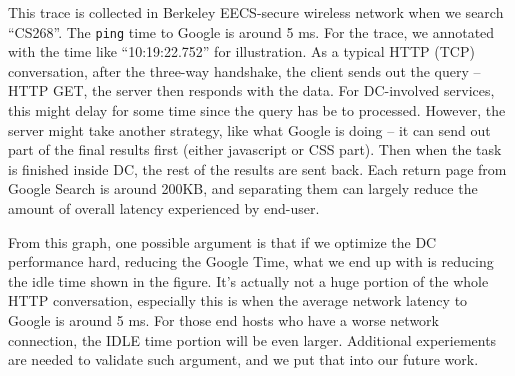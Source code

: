 This trace is collected in Berkeley EECS-secure wireless network when we search ``CS268''. The \texttt{ping} time to Google is around 5 ms. For the trace, we annotated with the time like ``10:19:22.752'' for illustration. As a typical HTTP (TCP) conversation, after the three-way handshake, the client sends out the query -- HTTP GET, the server then responds with the data. For DC-involved services, this might delay for some time since the query has be to processed. However, the server might take another strategy, like what Google is doing -- it can send out part of the final results first (either javascript or CSS part). Then when the task is finished inside DC, the rest of the results are sent back. Each return page from Google Search is around 200KB, and separating them can largely reduce the amount of overall latency experienced by end-user. 

From this graph, one possible argument is that if we optimize the DC performance hard, reducing the Google Time, what we end up with is reducing the idle time shown in the figure. It's actually not a huge portion of the whole HTTP conversation, especially this is when the average network latency to Google is around 5 ms. For those end hosts who have a worse network connection, the IDLE time portion will be even larger. Additional experiements are needed to validate such argument, and we put that into our future work.


